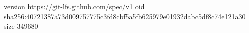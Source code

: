 version https://git-lfs.github.com/spec/v1
oid sha256:40721387a73d009757775c3fd8cbf5a5fb625979e01932dabc5df8c74e121a30
size 349680
